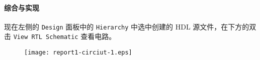 \documentclass{ctexart}
\begin{document}
        \paragraph{综合与实现}

        现在左侧的 \verb|Design| 面板中的 \verb|Hierarchy| 中选中创建的 HDL 源文件，在下方的双击 \verb|View RTL Schematic| 查看电路。

        \begin{figure}
\centering
\texttt{[image: report1-circiut-1.eps]}
\caption[Circuit]{}
\label{fig:report1-circiut-1}
\end{figure}
\end{document}
